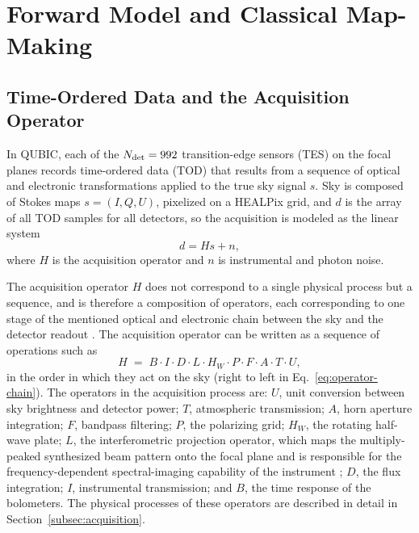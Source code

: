\documentclass[a4paper,11pt]{article}
\begin{document}
\section{Forward Model and Classical Map-Making}
\label{sec:forward}

\subsection{Time-Ordered Data and the Acquisition Operator}
\label{subsec:tod}

In QUBIC, each of the $N_{\rm det}=992$ transition-edge sensors (TES) on the focal planes records time-ordered data (TOD) that results from a
sequence of optical and electronic transformations
applied to the true sky signal $s$. Sky is composed of Stokes maps $s=(I,Q,U)$, pixelized on a HEALPix grid, and $d$ is the
array of all TOD samples for all detectors, so the acquisition is modeled as the linear system
\begin{equation}
    d = Hs + n,
    \label{eq:forward}
\end{equation}
where $H$ is the acquisition operator and $n$ is
instrumental and photon noise.

The acquisition operator $H$ does not correspond to a single physical process but a sequence, and is therefore a composition of operators, each corresponding to one
stage of the mentioned optical and electronic chain between the sky and the
detector readout \cite{mousset2022qubic2}. The acquisition operator can be written as a sequence of operations such as
\begin{equation}
    H \;=\; B \cdot I \cdot D \cdot L \cdot H_W \cdot P \cdot F \cdot A \cdot T \cdot U,
    \label{eq:operator-chain}
\end{equation}
in the order in which they act on the sky (right to left in Eq.~\ref{eq:operator-chain}). The operators in the acquisition process are:
$U$, unit conversion between sky brightness and detector power;
$T$, atmospheric transmission;
$A$, horn aperture integration;
$F$, bandpass filtering;
$P$, the polarizing grid;
$H_W$, the rotating half-wave plate;
$L$, the interferometric projection operator, which maps the
multiply-peaked synthesized beam pattern \cite{mousset2022qubic2}
onto the focal plane and is responsible for the frequency-dependent
spectral-imaging capability of the instrument
\cite{regnier2024freqmaps, regnier2024spectral};
$D$, the flux integration;
$I$, instrumental transmission;
and $B$, the time response of the bolometers. The physical processes of these operators are described in detail in Section~\ref{subsec:acquisition}.
\end{document}
